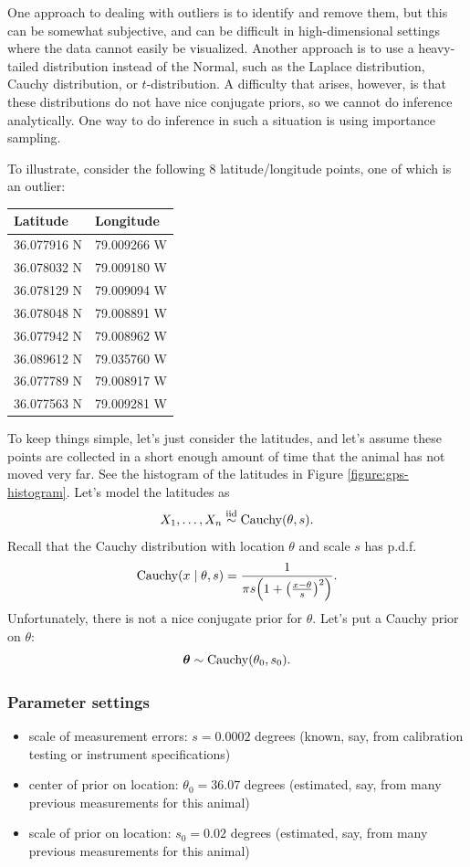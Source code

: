 \documentclass[12pt]{article}
\begin{document}
One approach to dealing with outliers is to identify and remove them, but this can be somewhat subjective, and can be difficult in high-dimensional settings where the data cannot easily be visualized. Another approach is to use a heavy-tailed distribution instead of the Normal, such as the Laplace distribution, Cauchy distribution, or $t$-distribution. A difficulty that arises, however, is that these distributions do not have nice conjugate priors, so we cannot do inference analytically. One way to do inference in such a situation is using importance sampling.

To illustrate, consider the following 8 latitude/longitude points, one of which is an outlier:

\begin{center}
\begin{tabular}{ll}
Latitude & Longitude \\
\hline
36.077916 N & 79.009266 W \\
36.078032 N & 79.009180 W \\
36.078129 N & 79.009094 W \\
36.078048 N & 79.008891 W \\
36.077942 N & 79.008962 W \\
36.089612 N & 79.035760 W \\
36.077789 N & 79.008917 W \\
36.077563 N & 79.009281 W \\
\end{tabular}
\end{center}

To keep things simple, let's just consider the latitudes, and let's assume these points are collected in a short enough amount of time that the animal has not moved very far. See the histogram of the latitudes in Figure \ref{figure:gps-histogram}. Let's model the latitudes as
$$X_1,\ldots,X_n\stackrel{\mathrm{iid}}{\sim} \operatorname*{Cauchy}(\theta,s).$$
Recall that the Cauchy distribution with location $\theta$ and scale $s$ has p.d.f.
$$\operatorname*{Cauchy}(x\mid \theta, s) = \frac{1}{\pi s \Big(1 + \big(\frac{x-\theta}{s}\big)^2\Big)}.$$
Unfortunately, there is not a nice conjugate prior for $\theta$. Let's put a Cauchy prior on $\theta$:
$${\bm\theta}\sim \operatorname*{Cauchy}(\theta_0,s_0).$$

\subsubsection*{Parameter settings}
\begin{itemize}
    \item scale of measurement errors: $s = 0.0002$ degrees (known, say, from calibration testing or instrument specifications)
    \item center of prior on location: $\theta_0 = 36.07$ degrees (estimated, say, from many previous measurements for this animal)
    \item scale of prior on location: $s_0 = 0.02$ degrees (estimated, say, from many previous measurements for this animal)
\end{itemize}
\end{document}
